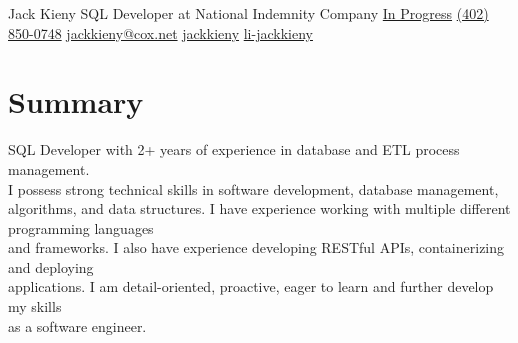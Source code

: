 \documentclass[]{latex/resume}
\begin{document}
%
%

\namesection
    {Jack}
    {Kieny}
    {SQL Developer at National Indemnity Company}
    {\contactline
        {\href{}{In Progress}}
        {\href{tel:+1402850047}{(402) 850-0748}}
        {\href{mailto:jackkieny@cox.net}{jackkieny@cox.net}}
        {\href{https://www.github.com/jackkieny}{jackkieny}}
        {\href{https://www.linkedin.com/in/jackkieny}{li-jackkieny}}
    }       
        

%
%

\begin{minipage}[t]{0.75\textwidth} 

\section{Summary}
SQL Developer with 2+ years of experience in database and ETL process management. \\
I possess strong technical skills in software development, database management, algorithms, and data structures.
I have experience working with multiple different programming languages\\and frameworks. I also have experience developing RESTful APIs, containerizing and deploying\\applications.
I am detail-oriented, proactive, eager to learn and further develop my skills\\as a software engineer.


\sectionsep



\end{minipage}
\end{document}
